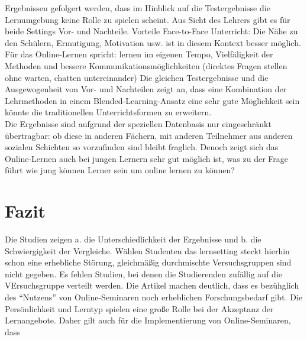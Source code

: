 \documentclass[12pt, bibliography=totoc]{scrartcl}
\begin{document}
Ergebnissen gefolgert werden, dass im Hinblick auf die Testergebnisse
die Lernumgebung keine Rolle zu spielen scheint. Aus Sicht des Lehrers
gibt es für beide Settings Vor- und Nachteile. Vorteile Face-to-Face
Unterricht: Die Nähe zu den Schülern, Ermutigung, Motivation usw. ist in
diesem Kontext besser möglich. Für das Online-Lernen spricht: lernen im
eigenen Tempo, Vielfäligkeit der Methoden und bessere
Kommunikationsmöglichkeiten (direktes Fragen stellen ohne warten,
chatten untereinander) Die gleichen Testergebnisse und die
Ausgewogenheit von Vor- und Nachteilen zeigt an, dass eine Kombination
der Lehrmethoden in einem Blended-Learning-Ansatz eine sehr gute
Möglichkeit sein könnte die traditionellen Unterrichtsformen zu
erweitern.\\Die Ergebnisse sind aufgrund der speziellen Datenbasis nur
eingeschränkt übertragbar: ob diese in anderen Fächern, mit anderen
Teilnehmer aus anderen sozialen Schichten so vorzufinden sind bleibt
fraglich. Denoch zeigt sich das Online-Lernen auch bei jungen Lernern
sehr gut möglich ist, was zu der Frage führt wie jung können Lerner sein
um online lernen zu können?

\section{Fazit}\label{fazit}

Die Studien zeigen a. die Unterschiedlichkeit der Ergebnisse und b. die
Schwiergigkeit der Vergleiche. Wählen Studenten das lernsetting steckt
hierhin schon eine erhebliche Störung, gleichmäßig durchmischte
Versuchsgruppen sind nicht gegeben. Es fehlen Studien, bei denen die
Studierenden zufällig auf die VErsuchsgruppe verteilt werden. Die
Artikel machen deutlich, dass es bezühglich des ``Nutzens'' von
Online-Seminaren noch erheblichen Forschungsbedarf gibt. Die
Persönlichkeit und Lerntyp spielen eine große Rolle bei der Akzeptanz
der Lernangebote. Daher gilt auch für die Implementierung von
Online-Seminaren, dass
\pagebreak
\printbibliography
\pagebreak
%
%
\end{document}
